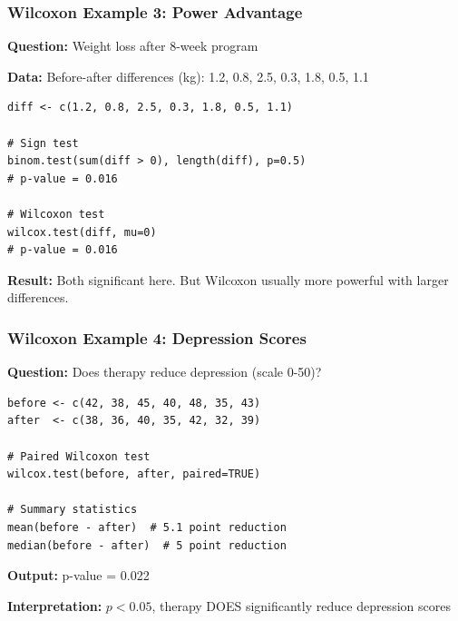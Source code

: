 \documentclass{beamer}
\begin{document}
\begin{frame}[fragile]
\frametitle{Wilcoxon Example 3: Power Advantage}
\textbf{Question:} Weight loss after 8-week program

\vspace{0.3cm}
\textbf{Data:} Before-after differences (kg): 1.2, 0.8, 2.5, 0.3, 1.8, 0.5, 1.1

\vspace{0.3cm}
\begin{small}
\begin{verbatim}
diff <- c(1.2, 0.8, 2.5, 0.3, 1.8, 0.5, 1.1)

# Sign test
binom.test(sum(diff > 0), length(diff), p=0.5)
# p-value = 0.016

# Wilcoxon test
wilcox.test(diff, mu=0)
# p-value = 0.016
\end{verbatim}
\end{small}

\textbf{Result:} Both significant here. But Wilcoxon usually more powerful with larger differences.
\end{frame}

\begin{frame}[fragile]
\frametitle{Wilcoxon Example 4: Depression Scores}
\textbf{Question:} Does therapy reduce depression (scale 0-50)?

\vspace{0.3cm}
\begin{small}
\begin{verbatim}
before <- c(42, 38, 45, 40, 48, 35, 43)
after  <- c(38, 36, 40, 35, 42, 32, 39)

# Paired Wilcoxon test
wilcox.test(before, after, paired=TRUE)

# Summary statistics
mean(before - after)  # 5.1 point reduction
median(before - after)  # 5 point reduction
\end{verbatim}
\end{small}

\textbf{Output:} p-value = 0.022

\textbf{Interpretation:} $p < 0.05$, therapy DOES significantly reduce depression scores
\end{frame}
\end{document}
